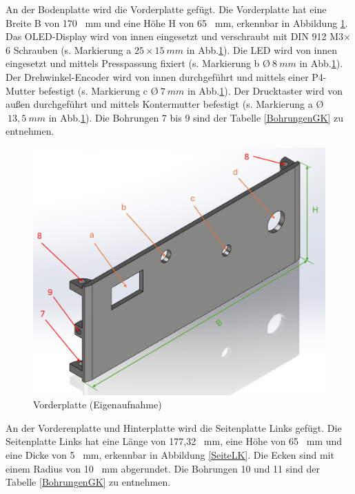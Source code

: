 An der Bodenplatte wird die Vorderplatte gefügt. Die Vorderplatte hat eine Breite B von 170 \ mm und eine Höhe H von 65 \ mm, erkennbar in Abbildung \ref{VorneK}. Das OLED-Display wird von innen eingesetzt und verschraubt mit DIN 912 M3$\times$6 Schrauben (s. Markierung a $25 \times 15 \ mm$  in Abb.\ref{VorneK}). Die LED wird von innen eingesetzt und mittels Presspassung fixiert (s. Markierung b \O $ \ 8 \ mm$ in Abb.\ref{VorneK}). Der Drehwinkel-Encoder wird von innen durchgeführt und mittels einer P4-Mutter befestigt (s. Markierung c \O $ \ 7 \ mm$  in Abb.\ref{VorneK}). Der Drucktaster wird von außen durchgeführt und mittels Kontermutter befestigt (s. Markierung a \O $ \ 13,5 \ mm$  in Abb.\ref{VorneK}). Die Bohrungen 7 bis 9 sind der Tabelle \ref{BohrungenGK} zu entnehmen.  


\begin{figure}[H]
	\begin{center}
		\includegraphics[width=\textwidth]{Images/Konstruktion/VorneK.png}
		\caption{Vorderplatte (Eigenaufnahme)} \label{VorneK}
	\end{center}
\end{figure}

An der Vorderenplatte und Hinterplatte wird die Seitenplatte Links gefügt. Die Seitenplatte Links hat eine Länge von 177,32 \ mm, eine Höhe von 65 \ mm und eine Dicke von 5 \ mm, erkennbar in Abbildung \ref{SeiteLK}. Die Ecken sind mit einem Radius von 10 \ mm abgerundet. Die Bohrungen 10 und 11 sind der Tabelle \ref{BohrungenGK} zu entnehmen. 


